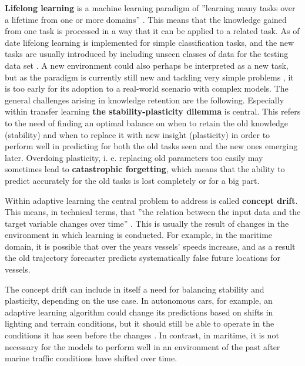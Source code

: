 \textbf{Lifelong learning} is a machine learning paradigm of ''learning many tasks over a lifetime from one or more domains'' \cite{lmlsystems}. This means that the knowledge gained from one task is processed in a way that it can be applied to a related task. As of date lifelong learning is implemented for simple classification tasks, and the new tasks are usually introduced by including unseen classes of data for the testing data set \cite{lmlinneuralnets}. A new environment could also perhaps be interpreted as a new task, but as the paradigm is currently still new and tackling very simple problems \cite{lmlinneuralnets}, it is too early for its adoption to a real-world scenario with complex models.
The general challenges arising in knowledge retention are the following. Especially within transfer learning \textbf{the stability-plasticity dilemma} is central. This refers to the need of finding an optimal balance on when to retain the old knowledge (stability) and when to replace it with new insight (plasticity) in order to perform well in predicting for both the old tasks seen and the new ones emerging later. Overdoing plasticity, i. e. replacing old parameters too easily may sometimes lead to \textbf{catastrophic forgetting}, which means that the ability to predict accurately for the old tasks is lost completely or for a big part.

Within adaptive learning the central problem to address is called \textbf{concept drift}. This means, in technical terms, that ''the relation between the input data and the target variable changes over time'' \cite{conceptdriftsurvey}. This is usually the result of changes in the environment in which learning is conducted. For example, in the maritime domain, it is possible that over the years vessels' speeds increase, and as a result the old trajectory forecaster predicts systematically false future locations for vessels.

The concept drift can include in itself a need for balancing stability and plasticity, depending on the use case. In autonomous cars, for example, an adaptive learning algorithm could change its predictions based on shifts in lighting and terrain conditions, but it should still be able to operate in the conditions it has seen before the changes \cite{conceptdriftsurvey}. In contrast, in maritime, it is not necessary for the models to perform well in an environment of the past after marine traffic conditions have shifted over time.

